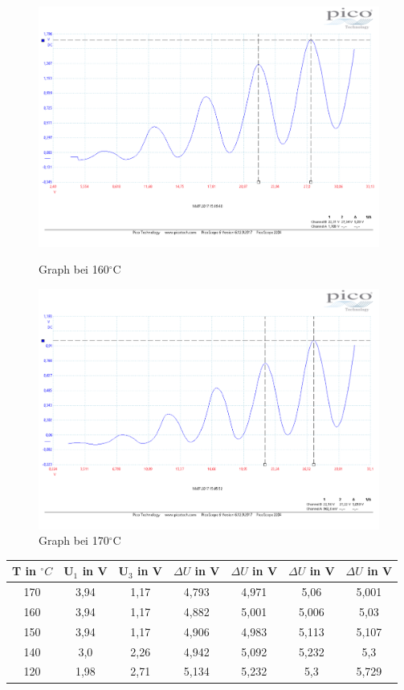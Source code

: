 \begin{figure}
	\includegraphics[width=\textwidth]{../Daten/Aufgabe1/Frank_Hertz_160.pdf}
	\caption{Graph bei 160$ ^\circ $C}
	\includegraphics[width=\textwidth]{../Daten/Aufgabe1/Frank_Hertz_170.pdf}
	\caption{Graph bei 170$ ^\circ $C}
\end{figure}
\begin{center}
	\begin{tabular}{|c|c|c|c|c|c|c|}
		\hline
		T in $^\circ C$ & U$_1$ in V & U$_3$ in V & $\Delta U$ in V & $\Delta U$ in V & $\Delta U$ in V & $\Delta U$ in V \\ \hline
		170       &    3,94    &    1,17    &      4,793      &      4,971      &      5,06       &      5,001      \\ \hline
		160       &    3,94    &    1,17    &      4,882      &      5,001      &      5,006      &      5,03       \\ \hline
		150       &    3,94    &    1,17    &      4,906      &      4,983      &      5,113      &      5,107      \\ \hline
		140       &    3,0     &    2,26    &      4,942      &      5,092      &      5,232      &       5,3       \\ \hline
		120       &    1,98    &    2,71    &      5,134      &      5,232      &       5,3       &      5,729      \\ \hline
	\end{tabular} 
\end{center}

